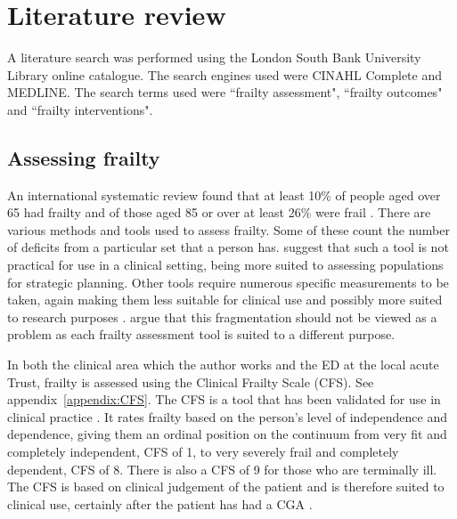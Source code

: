 \documentclass
[
	12pt,
	a4paper,
	oneside,
]{article}
\begin{document}
\section{Literature review}

A literature search was performed using the London South Bank University Library 
online catalogue. The search engines used were CINAHL Complete and MEDLINE. The
search terms used were ``frailty assessment", ``frailty outcomes" and ``frailty 
interventions".

\subsection{Assessing frailty}
An international systematic review found 
that at least 10\% of people aged over 65 had frailty and of those aged 85 or over
at least 26\% were frail \parencite{collard:12}. There are various methods and tools used to assess frailty.
Some of these count the number of deficits from a particular set that a person has. 
\textcite{sternberg:08} suggest that such a tool is not practical for use in a clinical
setting, being more suited to assessing populations for strategic planning. 
Other tools require numerous specific measurements to be taken, again making them
less suitable for clinical use \parencite{martin:08} and possibly more suited to research purposes
\parencite{ensrud:08}. \textcite{romero-ortuno:16} argue that this fragmentation should not
be viewed as a problem as each frailty assessment tool is suited to a different 
purpose. 

In both the clinical area which the author works and the ED at
the local acute Trust, frailty is assessed using the Clinical Frailty Scale (CFS).
See appendix~\ref{appendix:CFS}.
The CFS is a tool that has been validated for use in clinical practice 
\parencite{rockwood:05}. It rates frailty based on the person's level of independence
and dependence, giving them an ordinal position on the continuum from very fit and completely 
independent, CFS of 1, to very severely frail and completely dependent, CFS of 8.
There is also a CFS of 9 for those who are terminally ill. The CFS is based on clinical
judgement of the patient and is therefore suited to clinical use, certainly after
the patient has had a CGA \parencite{bgs:14}.
\end{document}

